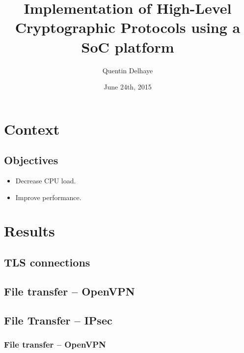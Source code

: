 \documentclass[xcolor={x11names, rgb, usenames, dvipsnames}]{beamer}
\author{Quentin Delhaye}
\title[Crypto using a Soc Platform]{Implementation of High-Level\\ Cryptographic Protocols using a SoC platform}
\institute[ULB]{Université Libre de Bruxelles}
\date{June 24th, 2015}
\newcommand\Wider[2][3em]{%
\makebox[\linewidth][c]{%
  \begin{minipage}{\dimexpr\textwidth+#1\relax}
  \raggedright#2
  \end{minipage}%
  }%
}
\begin{document}
\begin{frame}
\titlepage
\end{frame}

\begin{frame}
	\tableofcontents
\end{frame}


\section{Context}

\subsection{Objectives}
\begin{frame}
\begin{itemize}
	\item Decrease CPU load.
	\item Improve performance.
\end{itemize}
\end{frame}



\section{Results}

\subsection{TLS connections}

\subsection{File transfer -- OpenVPN}

\subsection{File Transfer -- IPsec}



\begin{frame}
\frametitle{File transfer -- OpenVPN}
\Wider[1em]{%
	\begin{minipage}[c]{.48\linewidth}
		\begin{tikzpicture}
		
		\end{tikzpicture}
	\end{minipage} \hfill
	\begin{minipage}[c]{.44\linewidth}
		\begin{tikzpicture}
		
		\end{tikzpicture}
		\vspace{0.7cm}
	\end{minipage}
}
\end{frame}
\end{document}
